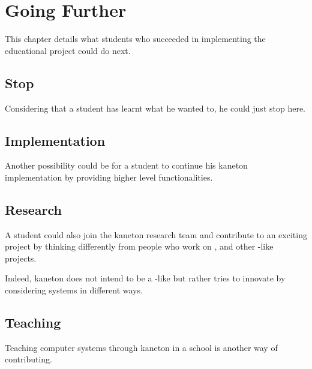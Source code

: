 %
%
%
%
%
%

%
%

\chapter{Going Further}
\label{chapter:further}

This chapter details what students who succeeded in implementing the
 educational project could do next.

\newpage

%
%

%
%

\section{Stop}

Considering that a student has learnt what he wanted to, he could just stop
here.

%
%

\section{Implementation}

Another possibility could be for a student to continue his kaneton
implementation by providing higher level functionalities.

%
%

\section{Research}

A student could also join the kaneton research team and contribute to an
exciting project by thinking differently from people who work on ,
 and other -like projects.

Indeed, kaneton does not intend to be a -like but rather tries to
innovate by considering systems in different ways.

%
%

\section{Teaching}

Teaching computer systems through kaneton in a school is another way of
contributing.
